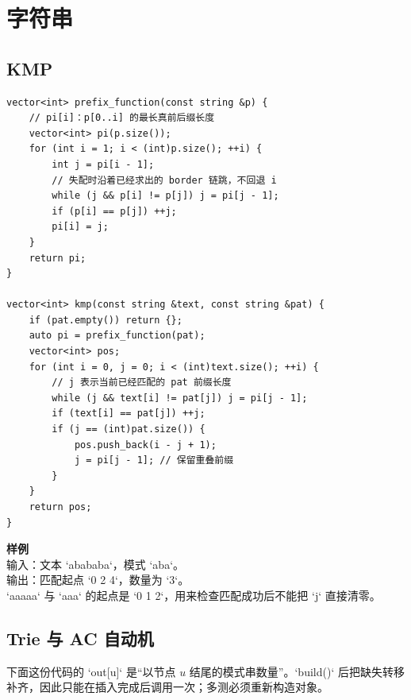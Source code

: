 \chapter{字符串}

\section{KMP}


\begin{lstlisting}[style=cpp]
vector<int> prefix_function(const string &p) {
    // pi[i]：p[0..i] 的最长真前后缀长度
    vector<int> pi(p.size());
    for (int i = 1; i < (int)p.size(); ++i) {
        int j = pi[i - 1];
        // 失配时沿着已经求出的 border 链跳，不回退 i
        while (j && p[i] != p[j]) j = pi[j - 1];
        if (p[i] == p[j]) ++j;
        pi[i] = j;
    }
    return pi;
}

vector<int> kmp(const string &text, const string &pat) {
    if (pat.empty()) return {};
    auto pi = prefix_function(pat);
    vector<int> pos;
    for (int i = 0, j = 0; i < (int)text.size(); ++i) {
        // j 表示当前已经匹配的 pat 前缀长度
        while (j && text[i] != pat[j]) j = pi[j - 1];
        if (text[i] == pat[j]) ++j;
        if (j == (int)pat.size()) {
            pos.push_back(i - j + 1);
            j = pi[j - 1]; // 保留重叠前缀
        }
    }
    return pos;
}
\end{lstlisting}

\begin{card}
\textbf{样例}\\
输入：文本 `abababa`，模式 `aba`。\\
输出：匹配起点 `0 2 4`，数量为 `3`。\\
`aaaaa` 与 `aaa` 的起点是 `0 1 2`，用来检查匹配成功后不能把 `j` 直接清零。
\end{card}

\section{Trie 与 AC 自动机}


下面这份代码的 `out[u]` 是“以节点 \(u\) 结尾的模式串数量”。`build()` 后把缺失转移补齐，因此只能在插入完成后调用一次；多测必须重新构造对象。

